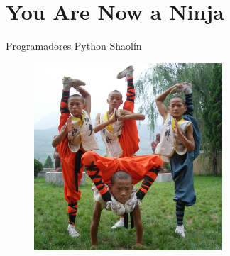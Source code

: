 \documentclass[14pt]{beamer}
\begin{document}
\section{You Are Now a Ninja}
\begin{frame}[fragile]{Programadores Python Shaolín}
  \begin{figure}
    \centering
    \includegraphics[height=7cm]{pics/shaolin.jpg}
  \end{figure}
\end{frame}
\end{document}
